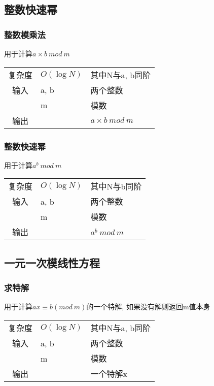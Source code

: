     \subsection{整数快速幂}\small
        \subsubsection{整数模乘法}\small
用于计算$a \times b \ mod\ m$
\begin{longtable}{|c|l|l|}
复杂度 & $O(\log N)$ & 其中N与a, b同阶  \\
输入 & a, b & 两个整数 \\
 & m & 模数 \\
输出 &  & $a \times b \ mod\ m$ \\
\end{longtable}



        \subsubsection{整数快速幂}\small
用于计算$a^{b} \ mod\ m$
\begin{longtable}{|c|l|l|}
复杂度 & $O(\log N)$ & 其中N与b同阶 \\
输入 & a, b & 两个整数 \\
 & m & 模数 \\
输出 &  & $a^{b} \ mod\ m$ \\
\end{longtable}



    \subsection{一元一次模线性方程}\small
        \subsubsection{求特解}\small
用于计算$ax \equiv b(mod\ m)$的一个特解, 如果没有解则返回m值本身
\begin{longtable}{|c|l|l|}
复杂度 & $O(\log N)$ & 其中N与a, b同阶  \\
输入 & a, b & 两个整数 \\
 & m & 模数 \\
输出 &  & 一个特解x \\
\end{longtable}




